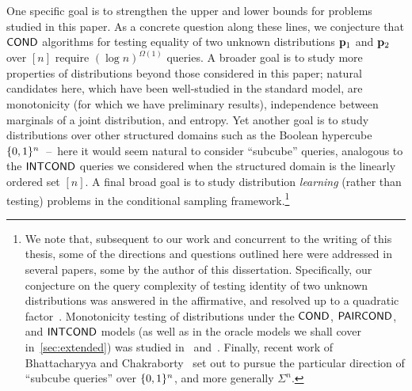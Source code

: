 One specific goal is to strengthen the upper and lower bounds for problems
studied in this paper. As a concrete question along these lines,
we conjecture that ${\sf COND}$ algorithms for testing equality of two unknown
distributions $\mathbf{p}_1$ and $\mathbf{p}_2$ over $[n]$ require $(\log n)^{\Omega(1)}$
queries.  A broader goal is to study more properties of distributions
beyond those considered in this paper; natural candidates here,
which have been well-studied in the standard model, are monotonicity
{(for which we have preliminary results)},
independence between marginals of a joint distribution, and entropy.
Yet another goal is to study distributions over other structured
domains such as the Boolean hypercube $\{0,1\}^n$~--~here it would seem
natural to consider ``subcube'' queries, analogous to the ${\sf INTCOND}$ queries
we considered when the structured domain is the linearly ordered set $[n]$.
A final broad goal is to study distribution \emph{learning}
(rather than testing) problems in the conditional sampling framework.\footnote{We note that, subsequent to our work and concurrent to the writing of this thesis, some of the directions and questions outlined here were addressed in several papers, some by the author of this dissertation. Specifically, our conjecture on the query complexity of testing identity of two unknown distributions was answered in the affirmative, and resolved up to a quadratic factor~\cite{ACK:14,FJOPS:15}. Monotonicity testing of distributions under the ${\sf COND}$, ${\sf PAIRCOND}$, and ${\sf INTCOND}$ models (as well as in the oracle models we shall cover in~\cref{sec:extended}) was studied in~\cite{Canonne:15} and~\cite{Canonne:15:Survey}. Finally, recent work of Bhattacharyya and Chakraborty~\cite{CB:17} set out to pursue the particular direction of ``subcube queries'' over $\{0,1\}^n$, and more generally $\Sigma^n$.} 

